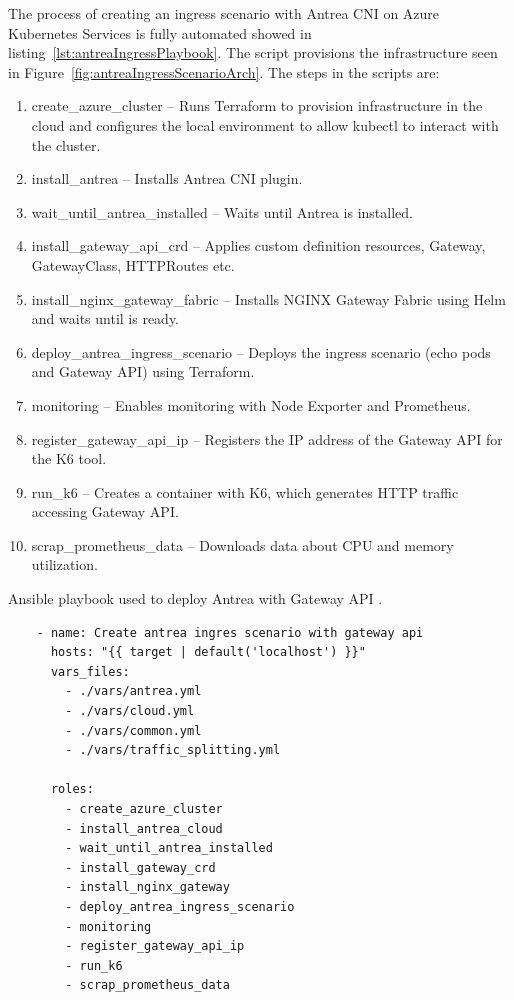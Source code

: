 The process of creating an ingress scenario with Antrea CNI on Azure Kubernetes Services is fully automated showed in listing~\ref{lst:antreaIngressPlaybook}. The script provisions the infrastructure seen in Figure~\ref{fig:antreaIngressScenarioArch}. The steps in the scripts are: 


\begin{enumerate}
  \item create\_azure\_cluster -- Runs Terraform to provision infrastructure in the cloud and configures the local environment to allow kubectl to interact with the cluster.
  \item install\_antrea -- Installs Antrea CNI plugin.
  \item wait\_until\_antrea\_installed -- Waits until Antrea is installed.
  \item install\_gateway\_api\_crd -- Applies custom definition resources, Gateway, GatewayClass, HTTPRoutes etc.
  \item install\_nginx\_gateway\_fabric -- Installs NGINX Gateway Fabric using Helm and waits until is ready.
  \item deploy\_antrea\_ingress\_scenario -- Deploys the ingress scenario (echo pods and Gateway API) using Terraform.
  \item monitoring -- Enables monitoring with Node Exporter and Prometheus.
  \item register\_gateway\_api\_ip -- Registers the IP address of the Gateway API for the K6 tool.
  \item run\_k6 -- Creates a container with K6, which generates HTTP traffic accessing Gateway API.
  \item scrap\_prometheus\_data -- Downloads data about CPU and memory utilization.
\end{enumerate}

\begin{listing}[H]
  \centering
  \caption{Ansible playbook used to deploy Antrea with Gateway API \cite{AnsiblePlaybook}.}
  \begin{verbatim}
    - name: Create antrea ingres scenario with gateway api
      hosts: "{{ target | default('localhost') }}"
      vars_files:
        - ./vars/antrea.yml
        - ./vars/cloud.yml
        - ./vars/common.yml
        - ./vars/traffic_splitting.yml

      roles:
        - create_azure_cluster
        - install_antrea_cloud
        - wait_until_antrea_installed
        - install_gateway_crd
        - install_nginx_gateway
        - deploy_antrea_ingress_scenario
        - monitoring
        - register_gateway_api_ip
        - run_k6
        - scrap_prometheus_data
  \end{verbatim}
  \label{lst:antreaIngressPlaybook}
\end{listing}


